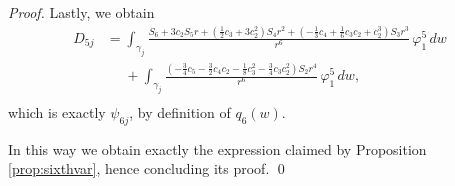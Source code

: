 \begin{proof}
Lastly, we obtain
\begin{align*}
 D_{5j} &= \int_{\gamma_j}\frac{S_6+3c_2S_5r+\left(\frac{1}{2}c_3+3c_2^2\right)S_4r^2+\left(-\frac{1}{3}c_4+\frac{1}{6}c_3c_2+c_2^3\right)S_3r^3}{r^6}\,\varphi_1^5\,dw \\
&\phantom{=} +\int_{\gamma_j}\frac{\left(-\frac{3}{4}c_5-\frac{3}{2}c_4c_2-\frac{1}{8}c_3^2-\frac{3}{4}c_3c_2^2\right)S_2r^4}{r^6}\,\varphi_1^5\,dw,  \\
\end{align*}
which is exactly $\psi_{6j}$, by definition of $q_6(w)$.

In this way we obtain exactly the expression claimed by Proposition \ref{prop:sixthvar}, hence concluding its proof. \qed
\end{proof}

























